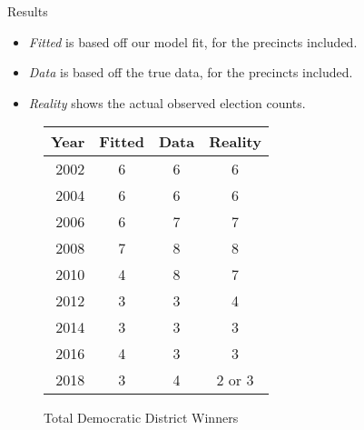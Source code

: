 \documentclass[final]{beamer}
\newlength{\colwidside}
\newlength{\colwidmiddle}
\begin{document}
\begin{frame}[t]
\begin{columns}[t]
\begin{column}{\colwidside}
\begin{block}{Results}
  \vspace{.2in}
    \begin{minipage}[t]{0.45\linewidth}
    \begin{itemize} 
      \item \emph{Fitted} is based off our model fit, for the precincts included.
      \item \emph{Data} is based off the true data, for the precincts
        included.
      \item \emph{Reality} shows the actual observed election counts.
    \end{itemize}
  \end{minipage}
  \hfill
  \begin{minipage}[t]{0.75\linewidth}
    \centering
    \vspace{-1.5ex} 
    \begin{figure}
    \centering
      \begin{tabular}{r|c|c|c}
  Year & Fitted & Data & Reality \\
  \hline
  2002  & 6 & 6 & 6 \\
  2004  & 6 & 6 & 6 \\
  2006  & 6 & 7 & 7 \\ 
  2008  & 7 & 8 & 8 \\
  2010  & 4 & 8 & 7 \\
  2012  & 3 & 3 & 4 \\
  2014  & 3 & 3 & 3 \\
  2016  & 4 & 3 & 3 \\
  \hline      
  2018  & 3 & 4 & 2 or 3 \\
\end{tabular}

    \caption{Total Democratic District Winners}
    \end{figure}
  \end{minipage} 



  


\end{block}
\end{column}
\end{columns}
\end{frame}
\end{document}
